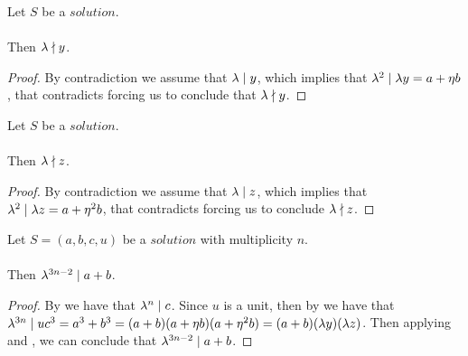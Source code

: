 \begin{lemma}
    \label{lmm:lambda_not_dvd_y}
    \leanok
    Let $S$ be a $solution$.\\\\
    Then $\lambda \nmid y$.
\end{lemma}
\begin{proof}
    \leanok
    By contradiction we assume that $\lambda \mid y$, which implies that
    $\lambda^2 \mid \lambda y = a + \eta b$, that contradicts
     forcing us to conclude that
    $\lambda \nmid y$.
\end{proof}

\begin{lemma}
    \label{lmm:lambda_not_dvd_z}
    \leanok
    Let $S$ be a $solution$.\\\\
    Then $\lambda \nmid z$.
\end{lemma}
\begin{proof}
    \leanok
    By contradiction we assume that $\lambda \mid z$, which implies that
    $\lambda^2 \mid \lambda z = a + \eta^2 b$, that contradicts
     forcing us to conclude $\lambda \nmid z$.
\end{proof}

\begin{lemma}
    \label{lmm:lambda_pow_dvd_a_add_b}
    \leanok
    Let $S=(a, b, c, u)$ be a $solution$ with multiplicity $n$.\\\\
    Then $\lambda^{3n -2} \mid a + b$.
\end{lemma}
\begin{proof}
    \leanok
    By  we have that $\lambda^n \mid c$.
    Since $u$ is a unit, then by  we have that
    $\lambda^{3n} \mid u  c^3 = a^3 + b^3 = (a+b)  (a + \eta  b)  (a + \eta^2  b)
    = (a+b)(\lambda y)(\lambda z)$.
    Then applying  and , we can conclude
    that $\lambda^{3n-2} \mid a+b$.
\end{proof}


